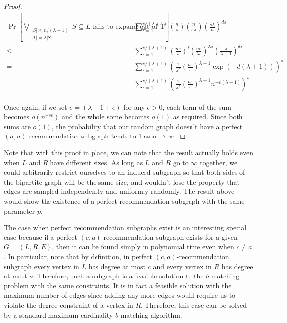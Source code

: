 \begin{proof}
\begin{align*}
       \Pr\left[\bigvee_{\substack{|S|\leq n/(\lambda+1) \\ |T| = \lambda |S|}} \text{$S\subseteq L$ fails to expand out of T}\right]
\leq&  \sum_{s=1}^{n/(\lambda+1)} \binom{n}{s}\binom{n}{s\lambda}\left(\frac{s\lambda}{n}\right)^{ds}\\
\leq&  \sum_{s=1}^{n/(\lambda+1)} \left(\frac{ne}{s}\right)^s \left(\frac{ne}{\lambda s}\right)^{\lambda s} \left(\frac{\lambda}{\lambda+1}\right)^{ds}\\
=&     \sum_{s=1}^{n/(\lambda+1)} \left(\frac{1}{\lambda^\lambda}\left(\frac{ne}{s}\right)^{\lambda+1}\exp(-d(\lambda+1))\right)^s \\
=&     \sum_{s=1}^{n/(\lambda+1)} \left(\frac{1}{\lambda^\lambda}\left(\frac{ne}{s}\right)^{\lambda+1}n^{-c(\lambda+1)}\right)^s \\
\end{align*}

Once again, if we set $c=(\lambda+1+\epsilon)$ for any $\epsilon > 0$, each term of the sum becomes $o(n^{-s\epsilon})$ and the whole some becomes $o(1)$ as required. Since both sums are $o(1)$, the probability that our random graph doesn't have a perfect $(a,a)$-recommendation subgraph tends to 1 as $n\to\infty$.

\end{proof}

Note that with this proof in place, we can note that the result actually holds even when $L$ and $R$ have different sizes. As long as $L$ and $R$ go to $\infty$ together, we could arbitrarily restrict ourselves to an induced subgraph so that both sides of the bipartite graph will be the same size, and wouldn't lose the property that edges are sampled independently and uniformly randomly. The result above would show the existence of a perfect recommendation subgraph with the same parameter $p$. \vs

The case when perfect recommendation subgraphs exist is an interesting special case because if  a perfect $(c,a)$-recommendation subgraph exists for a given $G=(L,R,E)$, then it can be found simply in polynomial time even when $c\ne a$. In particular, note that by definition, in perfect $(c,a)$-recommendation subgraph every vertex in $L$ has degree at most $c$ and every vertex in $R$ has degree at most $a$. Therefore, such a subgraph is a feasible solution to the $b$-matching problem with the same constraints. It is in fact a feasible solution with the maximum number of edges since adding any more edges would require us to violate the degree constraint of a vertex in $R$. Therefore, this case can be solved by a standard maximum cardinality $b$-matching algorithm.